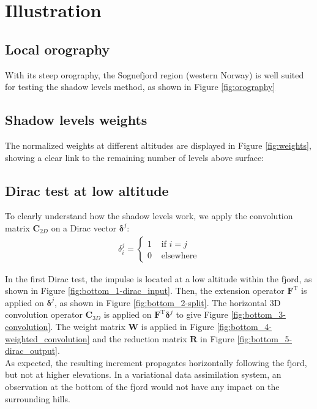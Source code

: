 \documentclass[12pt]{scrartcl}
\begin{document}
\section{Illustration}

\subsection{Local orography}
With its steep orography, the Sognefjord region (western Norway) is well suited for testing the shadow levels method, as shown in Figure \ref{fig:orography}

\subsection{Shadow levels weights}
The normalized weights at different altitudes are displayed in Figure \ref{fig:weights}, showing a clear link to the remaining number of levels above surface:

\subsection{Dirac test at low altitude}
To clearly understand how the shadow levels work, we apply the convolution matrix $\mathbf{C}_{2D}$ on a Dirac vector $\boldsymbol{\delta}^j$:
\begin{align}
\delta_i^j =
\left\{ \begin{array}{ll}
1 & \text{ if } i = j \\
0 & \text{ elsewhere}
\end{array} \right.
\end{align}

In the first Dirac test, the impulse is located at a low altitude within the fjord, as shown in Figure \ref{fig:bottom_1-dirac_input}. Then, the extension operator $\mathbf{F}^\text{T}$ is applied on $\boldsymbol{\delta}^j$, as shown in Figure \ref{fig:bottom_2-split}. The horizontal 3D convolution operator $\mathbf{C}_{3D}$ is applied on $\mathbf{F}^\text{T} \boldsymbol{\delta}^j$ to give Figure \ref{fig:bottom_3-convolution}. The weight matrix $\mathbf{W}$ is applied in Figure \ref{fig:bottom_4-weighted_convolution} and the reduction matrix $\mathbf{R}$ in Figure \ref{fig:bottom_5-dirac_output}.\\

As expected, the resulting increment propagates horizontally following the fjord, but not at higher elevations. In a variational data assimilation system, an observation at the bottom of the fjord would not have any impact on the surrounding hills.
\end{document}
